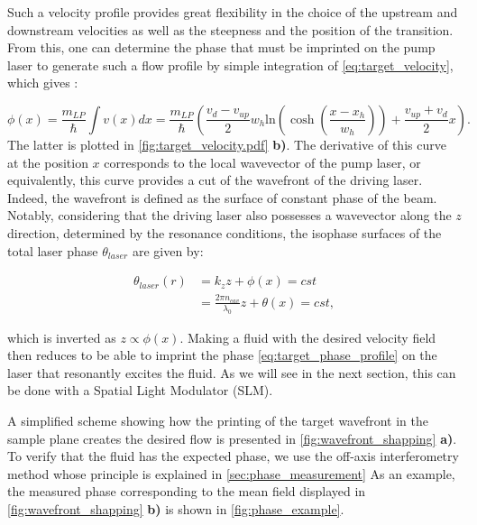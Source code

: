 Such a velocity profile provides great flexibility in the choice of the upstream and downstream velocities as well as the steepness and the position of the transition. From this, one can determine the phase that must be imprinted on the pump laser to generate such a flow profile by simple integration of \autoref{eq:target_velocity}, which gives :

\begin{equation}
    \phi(x) = \dfrac{m_{LP}}{\hbar} \int v(x) dx = \dfrac{m_{LP}}{\hbar} \left( \dfrac{v_{d}-v_{up}}{2} w_h \mathrm{ln}(\cosh(\dfrac{x-x_h}{w_h}))+\dfrac{v_{up}+v_{d}}{2}x \right).
    \label{eq:target_phase_profile}
\end{equation}
The latter is plotted in \autoref{fig:target_velocity.pdf} \textbf{b)}. The derivative of this curve at the position $x$ corresponds to the local wavevector of the pump laser, or equivalently, this curve provides a cut of the wavefront of the driving laser.
 Indeed, the wavefront is defined as the surface of constant phase of the beam. Notably, considering that the driving laser also possesses a wavevector along the $z$ direction, determined by the resonance conditions, the isophase surfaces of the total laser phase $\theta_{laser}$ are given by:  

\begin{equation}
    \begin{aligned}
    \theta_{laser}(r)&=k_zz+\phi(x)=cst \\
                      &=\frac{2\pi n_{cav} }{\lambda_0}z+\theta(x)= cst,
    \end{aligned}
\end{equation}

which is inverted as $z\propto \phi(x)$. Making a fluid with the desired velocity field then reduces to be able to imprint the phase \autoref{eq:target_phase_profile} on the laser that resonantly excites the fluid. As we will see in the next section, this can be done with a Spatial Light Modulator (SLM). 

 A simplified scheme showing how the printing of the target wavefront in the sample plane creates the desired flow is presented in \autoref{fig:wavefront_shapping} \textbf{a)}.
To verify that the fluid has the expected phase, we use the off-axis interferometry method whose principle is explained in \autoref{sec:phase_measurement}
As an example, the measured phase corresponding to the mean field displayed in \autoref{fig:wavefront_shapping} \textbf{b)} is shown in \autoref{fig:phase_example}.
 
